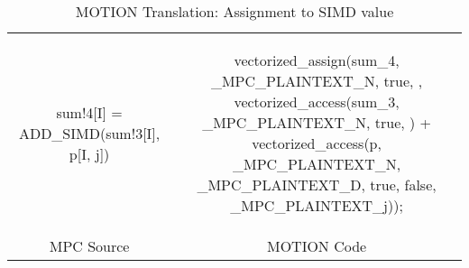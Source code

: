 \begin{table*}
\begin{tabular}{cc}
\begin{minipage}{0.33\textwidth}
{\small
\begin{pythonn}
sum!4[I] = ADD_SIMD(sum!3[I], p[I, j])
\end{pythonn}
}
\end{minipage}

&

\begin{minipage}{0.66\textwidth}
{\small
\begin{cppp}
vectorized_assign(sum_4, {_MPC_PLAINTEXT_N}, {true}, {},
      vectorized_access(sum_3, {_MPC_PLAINTEXT_N}, {true}, {}) +
      vectorized_access(p, {_MPC_PLAINTEXT_N, _MPC_PLAINTEXT_D}, {true, false},
           {_MPC_PLAINTEXT_j}));
\end{cppp}
}
\end{minipage}

\\

MPC Source & MOTION Code
\end{tabular}
\caption{MOTION Translation: Assignment to SIMD value}
\label{tab:motion_translation_simd_assignment}
\end{table*}



